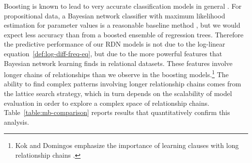 \documentclass[runningheads,a4paper]{llncs}
\begin{document}
 
Boosting is known to lead to very accurate classification models in general \cite{Bishop2006}. For propositional data, a Bayesian network classifier with maximum likelihood estimation for parameter values is a reasonable baseline method \cite{Grossman2004}, but we would expect less accuracy than from a boosted ensemble of regression trees. Therefore the predictive performance of our RDN models is not due to the log-linear equation~\eqref{def:log-diff-freq-eq}, but due to the more powerful features that Bayesian network learning finds in relational datasets. These features involve longer chains of relationships than we observe in the boosting models.\footnote{Kok and Domingos emphasize the importance of learning clauses with long relationship chains \cite{Kok2010}.} The ability to find complex patterns involving longer relationship chains comes from the lattice search strategy, which in turn depends on the scalability of model evaluation in order to explore a complex space of relationship chains. Table~\ref{table:mb-comparison} reports results that quantitatively confirm this analysis. 
\end{document}
